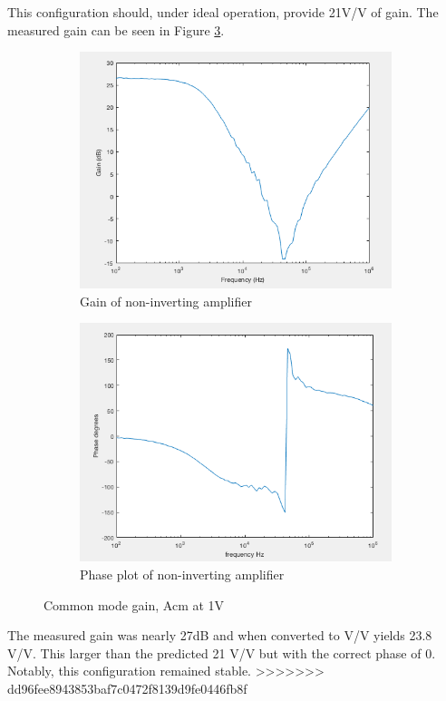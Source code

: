 This configuration should, under ideal operation, provide 21V/V  of gain. The measured gain can be seen in Figure \ref{fig:gainnoninverting}.
		
		
		
						\begin{figure}[H]
			\centering
			\begin{subfigure}[b]{0.45\textwidth}
				\centering
				\includegraphics[scale=.40]{ExperimentalImplementation/gainnoninverting.png}
\caption{Gain of non-inverting amplifier}
\label{fig:gainnoninverting1}
			\end{subfigure}
			\hfill
			\begin{subfigure}[b]{0.45\textwidth}
				\centering
			\includegraphics[scale=.40]{ExperimentalImplementation/phasenoninverting.png}
\caption{Phase plot of non-inverting amplifier}
\label{fig:phasenoninverting}
			\end{subfigure}
			\caption{Common mode gain, Acm at 1V}
			\label{fig:gainnoninverting}
		\end{figure} 
		
The measured gain was nearly 27dB and when converted to V/V yields 23.8 V/V.  This larger than the predicted 21 V/V but with the correct phase of 0. Notably, this configuration remained stable.
>>>>>>> dd96fee8943853baf7c0472f8139d9fe0446fb8f



	
	